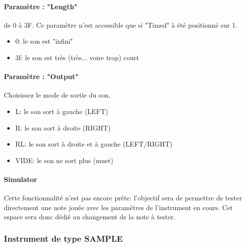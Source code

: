 \documentclass[12pt,a4paper]{article}
\begin{document}
        \paragraph{Paramètre : "Length"} de 0 à 3F. Ce paramètre n'est accessible que si "Timed" à été positionné sur 1.
            \begin{itemize}
                \item{0: le son est "infini"}
                \item{3f: le son est très (très... voire trop) court}
            \end{itemize}
        
        \paragraph{Paramètre : "Output"} Choisissez le mode de sortie du son.
            \begin{itemize}
                \item{L: le son sort à gauche (LEFT)}
                \item{R: le son sort à droite (RIGHT)}
                \item{RL: le son sort à droite et à gauche (LEFT/RIGHT)}
                \item{VIDE: le son ne sort plus (muet)}
            \end{itemize}
        
        \paragraph{Simulator} Cette fonctionnalité n'est pas encore prête: l'objectif sera de permettre de tester directement une note jouée avec les paramètres de l'instrument en cours. Cet espace sera donc dédié au changement de la note à tester.
        
        \subsubsection{Instrument de type SAMPLE}
        
        
    
\end{document}
